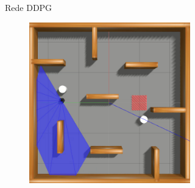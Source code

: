 \begin{figure}[H]
\begin{center}
\begin{subfigure}[b]{0.60\textwidth}
\begin{subfigure}[b]{0.24\textwidth}
        \end{subfigure}
        \caption{Rede DDPG}
        \label{subfig:simulated_env3_ddpg}
    \end{subfigure}
      
    \begin{subfigure}[b]{0.60\textwidth}
        \begin{subfigure}[b]{0.24\textwidth}
            \includegraphics[width=\textwidth]{imagens/simulated_envs/sim_env3_sac/1.png}
        \end{subfigure}
        \hfill
        \begin{subfigure}[b]{0.24\textwidth}

\end{subfigure}
\end{subfigure}
\end{center}
\end{figure}
